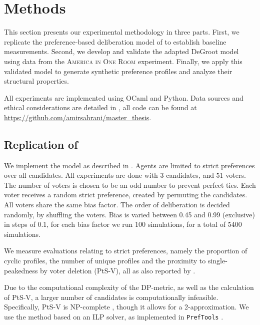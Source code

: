 \chapter{Methods}
\label{Methods}



This section presents our experimental methodology in three parts. First, we
replicate the preference-based deliberation model of
\citet{radDeliberationSinglePeakednessCoherent2021} to establish baseline
measurements. Second, we develop and validate the adapted DeGroot model using
data from the \textsc{America in One Room} experiment. Finally, we apply this validated
model to generate synthetic preference profiles and analyze their structural
properties.

All experiments are
implemented using OCaml and Python. Data sources and ethical considerations are
detailed in , all code can be found at \url{https://github.com/amirsahrani/master_thesis}.


\section{Replication of \citet{radDeliberationSinglePeakednessCoherent2021}}

We implement the model as described in . Agents are
limited to strict preferences over all candidates. All experiments are done with
3 candidates, and 51 voters. The number of voters is chosen to be an odd number
to prevent perfect ties. Each voter receives a random strict preference, created
by permuting the candidates. All voters share the same bias factor. The order of
deliberation is decided randomly, by shuffling the voters. Bias is varied
between 0.45 and 0.99 (exclusive) in steps of 0.1, for each bias factor we run 100
simulations, for a total of 5400 simulations.


We measure evaluations relating to strict preferences, namely the
proportion of cyclic profiles, the number of unique profiles and the proximity
to single-peakedness by voter deletion (PtS-V), all as also reported by
\citet{radDeliberationSinglePeakednessCoherent2021}.

Due to the computational complexity of the DP-metric, as well as the
calculation of PtS-V, a larger number of candidates is computationally
infeasible. Specifically, PtS-V is NP-complete
\cite{erdelyiComputationalAspectsNearly2013}, though it allows for a
2-approximation. We use the method based on an ILP solver, as implemented in
\texttt{PrefTools} \cite{PrefLibPreflibtools2025}.



